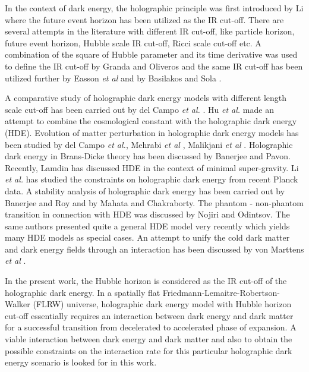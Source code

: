 \documentclass[11pt]{article}
\begin{document}
\par In the context of dark energy, the holographic principle was first introduced by Li\cite{liholo} where the future event horizon has been utilized as the IR cut-off. There are several attempts in the literature with different IR cut-off, like particle horizon\cite{holopart}, future event horizon\cite{liholo,holofu}, Hubble scale IR cut-off\cite{holohub, xu}, Ricci scale cut-off\cite{holoricci} etc. A combination of the square of Hubble parameter and its time derivative was used to define the IR cut-off by Granda and Oliveros \cite{Granda:2008dk} and the same IR cut-off has been utilized further by Easson {\it et al} \cite{Easson:2010av} and by Basilakos and Sola \cite{Basilakos:2014tha}. 

\par A comparative study of holographic dark energy models with different length scale cut-off has been carried out by del Campo {\it et al.} \cite{delCampo}.  Hu {\it et al.} made an attempt to combine the cosmological constant with the holographic dark energy\cite{huholocos} (HDE). Evolution of matter perturbation in holographic dark energy models has been studied by del Campo {\it et al.}\cite{delCampo2}, Mehrabi {\it et al} \cite{mehrabi}, Malikjani {\it et al} \cite{Malekjani:2016edh}. Holographic dark energy in Brans-Dicke theory has been discussed by Banerjee and Pavon\cite{nbpavon}. Recently, Lamdin\cite{lamdin} has discussed HDE in the context of minimal super-gravity. Li {\it et al.}\cite{liplanck} has studied the constraints on holographic dark energy from recent Planck data. A stability analysis of holographic dark energy has been carried out by Banerjee and Roy \cite{nbnr} and by Mahata and Chakraborty\cite{mahatacha}. The phantom - non-phantom transition in connection with HDE was discussed by Nojiri and Odintsov\cite{odin1}. The same authors presented quite a general HDE model very recently \cite{odin2} which yields many HDE models as special cases. An attempt to unify the cold dark matter and dark energy fields through an interaction has been discussed by von Marttens {\it et al} \cite{vonMarttens:2018iav}.


\par In the present work, the Hubble horizon is considered as the IR cut-off of the holographic dark energy. In a spatially flat  Friedmann-Lemaitre-Robertson-Walker (FLRW) universe, holographic dark energy model with Hubble horizon cut-off essentially requires an interaction between dark energy and dark matter for a successful transition from decelerated to accelerated phase of expansion\cite{liholo, holohub}. A viable interaction between dark energy and dark matter and also to obtain the possible constraints on the interaction rate for this particular holographic dark energy scenario is looked for in this work.
\end{document}
